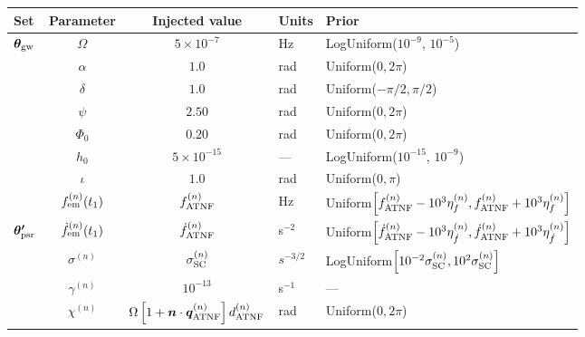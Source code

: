 \documentclass[fleqn,usenatbib,useAMS]{mnras}
\begin{document}
\begin{table}
	\centering
		\begin{tabular}{lccll}
			\toprule
			Set&Parameter & Injected value & Units & Prior  \\
			\hline
			\multirow{7}{2mm}{$\boldsymbol{\theta}_{\rm gw}$} & $\Omega$       & $5 \times 10^{-7}$ & Hz & LogUniform($10^{-9}$, $10^{-5}$) \\
			& $\alpha$          & $1.0$  & rad & Uniform($0, 2 \pi $)\\
			& $\delta$              & $1.0$  & rad & Uniform($-\pi/2, \pi/2$) \\
			& $\psi$              & $2.50$ & rad & Uniform($0, 2 \pi $) \\
			& $\Phi_0$          & $0.20$ & rad & Uniform($0, 2 \pi $) \\
			& $h_0$            & $5 \times 10^{-15}$ & --- & LogUniform($10^{-15}$, $10^{-9}$) \\
			& $\iota$             & $1.0$ & rad & Uniform($0, \pi$) \\ 
			\hline
			\vspace{1mm}& $f_{\rm em}^{(n)} (t_1)$       & $f_{\rm ATNF}^{(n)}$ & Hz & Uniform$\left[f_{\rm ATNF}^{(n)} - 10^3 \eta^{(n)}_{f}, f_{\rm ATNF}^{(n)} + 10^3 \eta^{(n)}_{f} \right]$ \\
      \multirow{2}{2mm}{$\boldsymbol{\theta'}_{\rm psr}$} & $\dot{f}_{\rm em}^{(n)} (t_1)$       & $\dot{f}_{\rm ATNF}^{(n)}$ & s$^{-2}$ & Uniform$\left[ \dot{f}_{\rm ATNF}^{(n)} - 10^3 \eta^{(n)}_{\dot{f}}, \dot{f}_{\rm ATNF}^{(n)} + 10^3 \eta^{(n)}_{\dot{f}} \right]$ \\
		     & $\sigma^{(n)}$              & $\sigma_{\rm SC}^{(n)}$ & $s^{-3/2}$ & LogUniform$ \left [10^{-2} \sigma_{\rm SC}^{(n)}, 10^2 \sigma_{\rm SC}^{(n)} \right ]$ \\
			& $\gamma^{(n)}$              & $10^{-13}$ & s$^{-1}$ & --- \\
			\vspace{1mm} &  $\chi^{(n)}$       &$\Omega \left[ 1 + \boldsymbol{n}\cdot \boldsymbol{q}^{(n)}_{\rm ATNF} \right]  d_{\rm ATNF}^{(n)} $  & rad & Uniform($0, 2 \pi $) \\
			\bottomrule
		\end{tabular}

\end{table}
\end{document}
